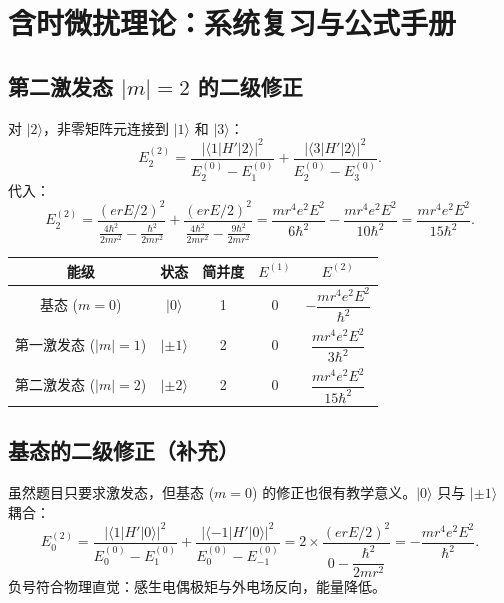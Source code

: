 
\section{含时微扰理论：系统复习与公式手册}
\label{sec:tdpt-review}

\subsection{第二激发态 $|m|=2$ 的二级修正}

\begin{derivationbox}[第二激发态 $|m|=2$ 的二级修正]
对 $|2\rangle$，非零矩阵元连接到 $|1\rangle$ 和 $|3\rangle$：
\[
E_2^{(2)} = \frac{|\langle 1|H'|2\rangle|^2}{E_2^{(0)} - E_1^{(0)}} + \frac{|\langle 3|H'|2\rangle|^2}{E_2^{(0)} - E_3^{(0)}}.
\]
代入：
\[
E_2^{(2)} = \frac{(erE/2)^2}{\frac{4\hbar^2}{2mr^2} - \frac{\hbar^2}{2mr^2}} + \frac{(erE/2)^2}{\frac{4\hbar^2}{2mr^2} - \frac{9\hbar^2}{2mr^2}} = \frac{mr^4 e^2 E^2}{6\hbar^2} - \frac{mr^4 e^2 E^2}{10\hbar^2} = \frac{mr^4 e^2 E^2}{15\hbar^2}.
\]

\begin{center}
\begin{tabular}{ccccc}
\hline
能级 & 状态 & 简并度 & $E^{(1)}$ & $E^{(2)}$ \\
\hline
基态 ($m=0$) & $|0\rangle$ & 1 & 0 & $-\dfrac{mr^4 e^2 E^2}{\hbar^2}$ \\
第一激发态 ($|m|=1$) & $|\pm 1\rangle$ & 2 & 0 & $\dfrac{mr^4 e^2 E^2}{3\hbar^2}$ \\
第二激发态 ($|m|=2$) & $|\pm 2\rangle$ & 2 & 0 & $\dfrac{mr^4 e^2 E^2}{15\hbar^2}$ \\
\hline
\end{tabular}
\end{center}
\end{derivationbox}

\subsection{基态的二级修正（补充）}

\begin{derivationbox}[基态的二级修正（补充）]
虽然题目只要求激发态，但基态 ($m=0$) 的修正也很有教学意义。$|0\rangle$ 只与 $|\pm 1\rangle$ 耦合：
\[
E_0^{(2)} = \frac{|\langle 1|H'|0\rangle|^2}{E_0^{(0)} - E_1^{(0)}} + \frac{|\langle -1|H'|0\rangle|^2}{E_0^{(0)} - E_{-1}^{(0)}} = 2 \times \frac{(erE/2)^2}{0 - \dfrac{\hbar^2}{2mr^2}} = -\frac{mr^4 e^2 E^2}{\hbar^2}.
\]
负号符合物理直觉：感生电偶极矩与外电场反向，能量降低。
\end{derivationbox}


